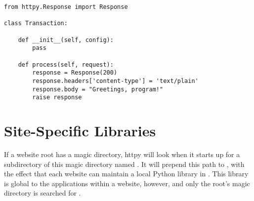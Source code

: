 \begin{verbatim}
from httpy.Response import Response

class Transaction:

    def __init__(self, config):
        pass

    def process(self, request):
        response = Response(200)
        response.headers['content-type'] = 'text/plain'
        response.body = "Greetings, program!"
        raise response

\end{verbatim}



\section{Site-Specific Libraries}

If a website root has a magic directory, httpy will look when it starts up for a
subdirectory of this magic directory named . It will prepend
this path to , with the effect that each website can maintain a
local Python library in . This library is
global to the applications within a website, however, and only the root's magic
directory is searched for .


